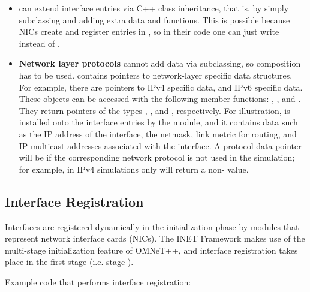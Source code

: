 \begin{itemize}

\item {} can extend interface entries via C++ class inheritance, that is, by
simply subclassing  and adding extra data and
functions. This is possible because NICs create and register entries in
, so in their code one can just write
 instead of .

\item \textbf{Network layer protocols} cannot add data via subclassing, so
composition has to be used.  contains pointers to
network-layer specific data structures. For example, there are pointers to
IPv4 specific data, and IPv6 specific data. These objects can be accessed with
the following  member functions: ,
, and .
They return pointers of the types ,
, and ,
respectively. For illustration,  is installed
onto the interface entries by the  module, and it
contains data such as the IP address of the interface, the netmask, link
metric for routing, and IP multicast addresses associated with the
interface. A protocol data pointer will be  if the corresponding
network protocol is not used in the simulation; for example, in IPv4
simulations only  will return a non- value.


\end{itemize}


\subsection{Interface Registration}

Interfaces are registered dynamically in the initialization phase by modules
that represent network interface cards (NICs). The INET Framework makes use
of the multi-stage initialization feature of OMNeT++, and interface registration takes
place in the first stage (i.e. stage ).

Example code that performs interface registration:

